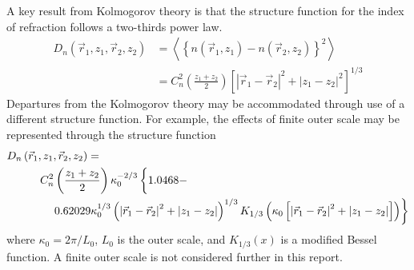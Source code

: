 A key result from Kolmogorov theory is that the structure function for the index of refraction follows a two-thirds power law.
\begin{equation}\label{eqn:kolmogorov}
\begin{aligned}
D_{n}\left(\vec{r}_{1}, z_{1}, \vec{r}_{2}, z_{2}\right) & = 
\left\langle \left\{n\left(\vec{r}_{1}, z_{1}\right) - n\left(\vec{r}_{2}, z_{2}\right)\right\}^{2} \right\rangle \\
& = 
C_{n}^{2}\left(\frac{z_{1} + z_{2}}{2}\right) \left[ \left\vert \vec{r}_{1} - \vec{r}_{2} \right\vert^{2} + \left\vert z_{1} - z_{2} \right\vert^{2}\right]^{1/3}
\end{aligned}
\end{equation}
Departures from the Kolmogorov theory may be accommodated through use
of a different structure function.  For example, the effects of finite 
outer scale may be represented through the structure function 
\begin{equation}
\begin{aligned}
&D_{n}\left(\vec{r}_{1}, z_{1}, \vec{r}_{2}, z_{2}\right) = \\
&\quad\quad\quad C_{n}^{2}\left(\frac{z_{1} + z_{2}}{2}\right) \kappa_{0}^{-2/3}
\left\{\vphantom{\left(\left\vert \vec{r}_{1} - \vec{r}_{2} \right\vert^{2} + \left\vert z_{1} - z_{2} \right\vert\right)^{1/3} }
1.0468 - \right.\\
&\quad\quad\quad\quad 
\left.
0.62029\kappa_{0}^{1/3}\left(\left\vert \vec{r}_{1} - \vec{r}_{2} \right\vert^{2} + \left\vert z_{1} - z_{2} \right\vert\right)^{1/3} 
K_{1/3}\left(\kappa_{0}\left[\left\vert \vec{r}_{1} - \vec{r}_{2} \right\vert^{2} + \left\vert z_{1} - z_{2} \right\vert\right]\right)\right\}
\end{aligned}
\end{equation}
where $\kappa_{0} = 2\pi / L_{0}$, $L_{0}$ is the outer scale, and
$K_{1/3}\left(x\right)$ is a modified Bessel
function\cite{Sasiela:2012}.  A finite outer scale is
not considered further in this report.

